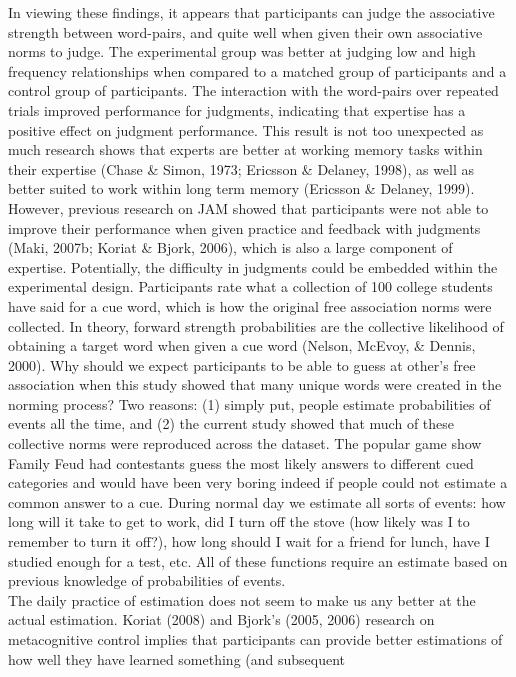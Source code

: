 \documentclass[english,man]{apa6}
\theoremstyle{definition}
\theoremstyle{definition}
\theoremstyle{definition}
\theoremstyle{remark}
\begin{document}
In viewing these findings, it appears that participants can judge the
associative strength between word-pairs, and quite well when given their
own associative norms to judge. The experimental group was better at
judging low and high frequency relationships when compared to a matched
group of participants and a control group of participants. The
interaction with the word-pairs over repeated trials improved
performance for judgments, indicating that expertise has a positive
effect on judgment performance. This result is not too unexpected as
much research shows that experts are better at working memory tasks
within their expertise (Chase \& Simon, 1973; Ericsson \& Delaney,
1998), as well as better suited to work within long term memory
(Ericsson \& Delaney, 1999). However, previous research on JAM showed
that participants were not able to improve their performance when given
practice and feedback with judgments (Maki, 2007b; Koriat \& Bjork,
2006), which is also a large component of expertise. Potentially, the
difficulty in judgments could be embedded within the experimental
design. Participants rate what a collection of 100 college students have
said for a cue word, which is how the original free association norms
were collected. In theory, forward strength probabilities are the
collective likelihood of obtaining a target word when given a cue word
(Nelson, McEvoy, \& Dennis, 2000). Why should we expect participants to
be able to guess at other's free association when this study showed that
many unique words were created in the norming process? Two reasons: (1)
simply put, people estimate probabilities of events all the time, and
(2) the current study showed that much of these collective norms were
reproduced across the dataset. The popular game show Family Feud had
contestants guess the most likely answers to different cued categories
and would have been very boring indeed if people could not estimate a
common answer to a cue. During normal day we estimate all sorts of
events: how long will it take to get to work, did I turn off the stove
(how likely was I to remember to turn it off?), how long should I wait
for a friend for lunch, have I studied enough for a test, etc. All of
these functions require an estimate based on previous knowledge of
probabilities of events.\\
The daily practice of estimation does not seem to make us any better at
the actual estimation. Koriat (2008) and Bjork's (2005, 2006) research
on metacognitive control implies that participants can provide better
estimations of how well they have learned something (and subsequent
\end{document}
